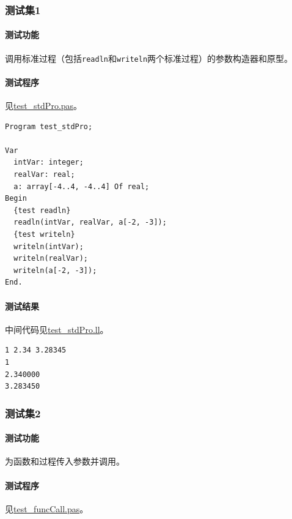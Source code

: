 \documentclass[lang=cn,11pt,a4paper,cite=authornum]{paper}
\begin{document}
\subsubsection{测试集1}

\paragraph{测试功能} 调用标准过程（包括\texttt{readln}和\texttt{writeln}两个标准过程）的参数构造器和原型。

\paragraph{测试程序} 见\href{run:../test/test_stdPro.pas}{test\_stdPro.pas}。

\begin{code}
    \begin{verbatim}
Program test_stdPro;

Var 
  intVar: integer;
  realVar: real;
  a: array[-4..4, -4..4] Of real;
Begin
  {test readln}
  readln(intVar, realVar, a[-2, -3]);
  {test writeln}
  writeln(intVar);
  writeln(realVar);
  writeln(a[-2, -3]);
End.
\end{verbatim}
\end{code}

\paragraph{测试结果} 中间代码见\href{run:../test/test_stdPro.ll}{test\_stdPro.ll}。

\begin{code}
    \begin{verbatim}
1 2.34 3.28345
1
2.340000
3.283450
\end{verbatim}
\end{code}

\subsubsection{测试集2}

\paragraph{测试功能} 为函数和过程传入参数并调用。

\paragraph{测试程序} 见\href{run:../test/test_funcCall.pas}{test\_funcCall.pas}。
\end{document}
